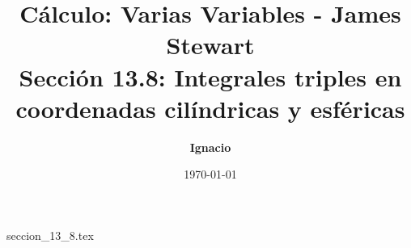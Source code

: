 \documentclass[11pt,spanish,oneside]{report}
\title{\textbf{Cálculo: Varias Variables - James Stewart} \\ \Large Sección 13.8: Integrales triples en coordenadas cilíndricas y esféricas}
\author{\textbf{Ignacio}}
\date{\today}
\begin{document}
\maketitle

{seccion_13_8.tex}
\end{document}
